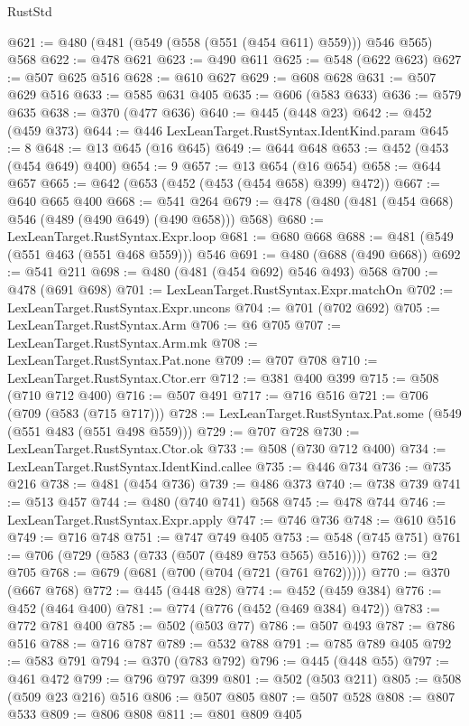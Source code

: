 \begin{lexlean}{RustStd}
\begin{coremodule}
@621 := @480 (@481 (@549 (@558 (@551 (@454 @611) @559))) @546 @565) @568
@622 := @478 @621
@623 := @490 @611
@625 := @548 (@622 @623)
@627 := @507 @625 @516
@628 := @610 @627
@629 := @608 @628
@631 := @507 @629 @516
@633 := @585 @631 @405
@635 := @606 (@583 @633)
@636 := @579 @635
@638 := @370 (@477 @636)
@640 := @445 (@448 @23)
@642 := @452 (@459 @373)
@644 := @446 LexLeanTarget.RustSyntax.IdentKind.param
@645 := 8
@648 := @13 @645 (@16 @645)
@649 := @644 @648
@653 := @452 (@453 (@454 @649) @400)
@654 := 9
@657 := @13 @654 (@16 @654)
@658 := @644 @657
@665 := @642 (@653 (@452 (@453 (@454 @658) @399) @472))
@667 := @640 @665 @400
@668 := @541 @264
@679 := @478 (@480 (@481 (@454 @668) @546 (@489 (@490 @649) (@490 @658))) @568)
@680 := LexLeanTarget.RustSyntax.Expr.loop
@681 := @680 @668
@688 := @481 (@549 (@551 @463 (@551 @468 @559))) @546
@691 := @480 (@688 (@490 @668))
@692 := @541 @211
@698 := @480 (@481 (@454 @692) @546 @493) @568
@700 := @478 (@691 @698)
@701 := LexLeanTarget.RustSyntax.Expr.matchOn
@702 := LexLeanTarget.RustSyntax.Expr.uncons
@704 := @701 (@702 @692)
@705 := LexLeanTarget.RustSyntax.Arm
@706 := @6 @705
@707 := LexLeanTarget.RustSyntax.Arm.mk
@708 := LexLeanTarget.RustSyntax.Pat.none
@709 := @707 @708
@710 := LexLeanTarget.RustSyntax.Ctor.err
@712 := @381 @400 @399
@715 := @508 (@710 @712 @400)
@716 := @507 @491
@717 := @716 @516
@721 := @706 (@709 (@583 (@715 @717)))
@728 := LexLeanTarget.RustSyntax.Pat.some (@549 (@551 @483 (@551 @498 @559)))
@729 := @707 @728
@730 := LexLeanTarget.RustSyntax.Ctor.ok
@733 := @508 (@730 @712 @400)
@734 := LexLeanTarget.RustSyntax.IdentKind.callee
@735 := @446 @734
@736 := @735 @216
@738 := @481 (@454 @736)
@739 := @486 @373
@740 := @738 @739
@741 := @513 @457
@744 := @480 (@740 @741) @568
@745 := @478 @744
@746 := LexLeanTarget.RustSyntax.Expr.apply
@747 := @746 @736
@748 := @610 @516
@749 := @716 @748
@751 := @747 @749 @405
@753 := @548 (@745 @751)
@761 := @706 (@729 (@583 (@733 (@507 (@489 @753 @565) @516))))
@762 := @2 @705
@768 := @679 (@681 (@700 (@704 (@721 (@761 @762)))))
@770 := @370 (@667 @768)
@772 := @445 (@448 @28)
@774 := @452 (@459 @384)
@776 := @452 (@464 @400)
@781 := @774 (@776 (@452 (@469 @384) @472))
@783 := @772 @781 @400
@785 := @502 (@503 @77)
@786 := @507 @493
@787 := @786 @516
@788 := @716 @787
@789 := @532 @788
@791 := @785 @789 @405
@792 := @583 @791
@794 := @370 (@783 @792)
@796 := @445 (@448 @55)
@797 := @461 @472
@799 := @796 @797 @399
@801 := @502 (@503 @211)
@805 := @508 (@509 @23 @216) @516
@806 := @507 @805
@807 := @507 @528
@808 := @807 @533
@809 := @806 @808
@811 := @801 @809 @405

\end{coremodule}
\end{lexlean}
